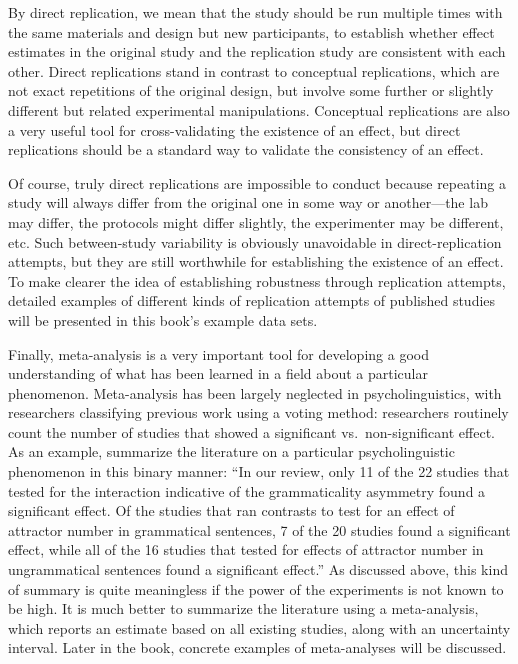 \documentclass[
  12pt,
]{krantz}
\theoremstyle{definition}
\theoremstyle{definition}
\theoremstyle{definition}
\theoremstyle{definition}
\theoremstyle{remark}
\begin{document}
By direct replication, we mean that the study should be run multiple times with the same materials and design but new participants, to establish whether effect estimates in the original study and the replication study are consistent with each other. Direct replications stand in contrast to conceptual replications, which are not exact repetitions of the original design, but involve some further or slightly different but related experimental manipulations. Conceptual replications are also a very useful tool for cross-validating the existence of an effect, but direct replications should be a standard way to validate the consistency of an effect.

Of course, truly direct replications are impossible to conduct because repeating a study will always differ from the original one in some way or another---the lab may differ, the protocols might differ slightly, the experimenter may be different, etc. Such between-study variability is obviously unavoidable in direct-replication attempts, but they are still worthwhile for establishing the existence of an effect. To make clearer the idea of establishing robustness through replication attempts, detailed examples of different kinds of replication attempts of published studies will be presented in this book's example data sets.

Finally, meta-analysis is a very important tool for developing a good understanding of what has been learned in a field about a particular phenomenon. Meta-analysis has been largely neglected in psycholinguistics, with researchers classifying previous work using a voting method: researchers routinely count the number of studies that showed a significant vs.~non-significant effect. As an example, \citet{hammerly2019grammaticality} summarize the literature on a particular psycholinguistic phenomenon in this binary manner: ``In our review, only 11 of the 22 studies that tested for the interaction indicative of the grammaticality asymmetry found a significant effect. Of the studies that ran contrasts to test for an effect of attractor number in grammatical sentences, 7 of the 20 studies found a significant effect, while all of the 16 studies that tested for effects of attractor number in ungrammatical sentences found a significant effect.'' As discussed above, this kind of summary is quite meaningless if the power of the experiments is not known to be high. It is much better to summarize the literature using a meta-analysis, which reports an estimate based on all existing studies, along with an uncertainty interval. Later in the book, concrete examples of meta-analyses will be discussed.
\end{document}

